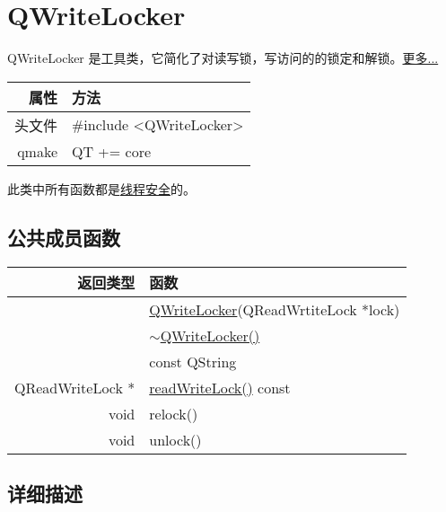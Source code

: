 \chapter{QWriteLocker}

QWriteLocker 是工具类，它简化了对读写锁，写访问的的锁定和解锁。\href{https://github.com/QtDocumentCN/QtDocumentCN/blob/master/Src/W/QWriteLocker/QWriteLocker.md#%E8%AF%A6%E7%BB%86%E6%8F%8F%E8%BF%B0}{更多...}

\begin{tabular}{|r|l|}
	\hline
	属性 & 方法 \\
	\hline
	头文件 & \#include <QWriteLocker>\\      
	\hline
	qmake & QT += core\\      
	\hline
\end{tabular}


\begin{notice}
此类中所有函数都是\href{https://github.com/QtDocumentCN/QtDocumentCN/blob/master/Src/R/Reentrancy_and_Thread-Safety/Reentrancy_and_Thread-Safety.md}{线程安全}的。
\end{notice}

\section{公共成员函数}

\begin{tabular}{|r|l|}
	\hline
	返回类型 & 函数 \\
	\hline
	&	\href{https://github.com/QtDocumentCN/QtDocumentCN/blob/master/Src/W/QWriteLocker/QWriteLocker.md#qwritelockerqwritelockerqreadwritelock-lock}{QWriteLocker}(QReadWrtiteLock *lock) \\
	\hline
	& \href{https://github.com/QtDocumentCN/QtDocumentCN/blob/master/Src/W/QWriteLocker/QWriteLocker.md#qwritelockerqwritelocker}{$\sim$QWriteLocker()} \\
	\hline
		&const QString\\
	\hline
	QReadWriteLock *	&\href{https://github.com/QtDocumentCN/QtDocumentCN/blob/master/Src/W/QWriteLocker/QWriteLocker.md#qreadwritelock-qwritelockerreadwritelock-const}{readWriteLock()}  const\\
	\hline
	void&	relock()\\
	\hline
	void &	unlock()\\
	\hline
\end{tabular}


\section{详细描述}


